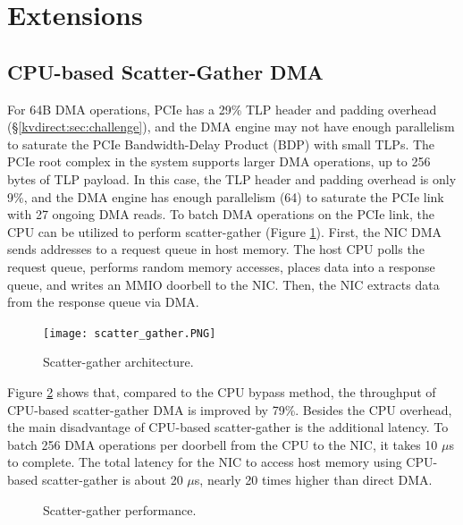 \section{Extensions}
\label{kvdirect:sec:extensions}

\subsection{CPU-based Scatter-Gather DMA}

For 64B DMA operations, PCIe has a 29\% TLP header and padding overhead (\S \ref {kvdirect:sec:challenge}), and the DMA engine may not have enough parallelism to saturate the PCIe Bandwidth-Delay Product (BDP) with small TLPs. The PCIe root complex in the system supports larger DMA operations, up to 256 bytes of TLP payload. In this case, the TLP header and padding overhead is only 9\%, and the DMA engine has enough parallelism (64) to saturate the PCIe link with 27 ongoing DMA reads. To batch DMA operations on the PCIe link, the CPU can be utilized to perform scatter-gather (Figure \ref {kvdirect:fig:sg-arch}). First, the NIC DMA sends addresses to a request queue in host memory. The host CPU polls the request queue, performs random memory accesses, places data into a response queue, and writes an MMIO doorbell to the NIC. Then, the NIC extracts data from the response queue via DMA.

\begin{figure}[htbp]
		\centering
		\texttt{[image: scatter\_gather.PNG]}
		\caption{Scatter-gather architecture.}
		\label{kvdirect:fig:sg-arch}
\end{figure}

Figure \ref {kvdirect:fig:scatter-gather} shows that, compared to the CPU bypass method, the throughput of CPU-based scatter-gather DMA is improved by 79\%. Besides the CPU overhead, the main disadvantage of CPU-based scatter-gather is the additional latency. To batch 256 DMA operations per doorbell from the CPU to the NIC, it takes 10 $\mu$s to complete. The total latency for the NIC to access host memory using CPU-based scatter-gather is about 20 $\mu$s, nearly 20 times higher than direct DMA.

\begin{figure}[htbp]
	\centering
	\caption{Scatter-gather performance.}
	\label{kvdirect:fig:scatter-gather}
\end{figure}

